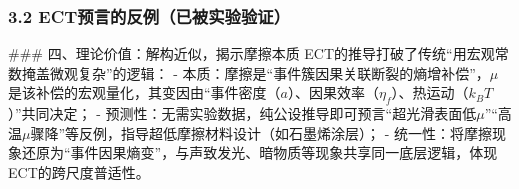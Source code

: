 \documentclass{article}
\begin{document}
\subsubsection{3.2 ECT预言的反例（已被实验验证）}
\begin{table}[h!]
\centering
{}
\end{table}


### 四、理论价值：解构近似，揭示摩擦本质
ECT的推导打破了传统“用宏观常数掩盖微观复杂”的逻辑：
- 本质：摩擦是“事件簇因果关联断裂的熵增补偿”，$\mu$是该补偿的宏观量化，其变因由“事件密度（$a$）、因果效率（$\eta_f$）、热运动（$k_B T$）”共同决定；
- 预测性：无需实验数据，纯公设推导即可预言“超光滑表面低$\mu$”“高温$\mu$骤降”等反例，指导超低摩擦材料设计（如石墨烯涂层）；
- 统一性：将摩擦现象还原为“事件因果熵变”，与声致发光、暗物质等现象共享同一底层逻辑，体现ECT的跨尺度普适性。
\end{document}
